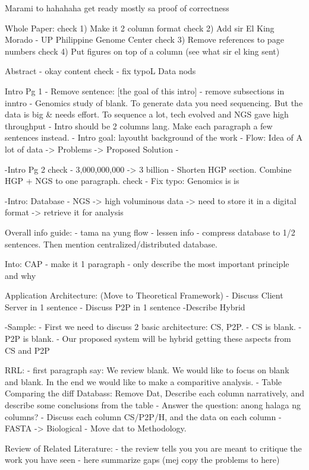 Marami to hahahaha get ready mostly sa proof of correctness

Whole Paper:
check 1) Make it 2 column format
check 2) Add sir El King Morado - UP Philippine Genome Center
check 3) Remove references to page numbers
check 4) Put figures on top of a column (see what sir el king sent)

Abstract
- okay content
check - fix typoL Data nods

Intro Pg 1
- Remove sentence: [the goal of this intro]
- remove subsections in inntro
- Genomics study of blank. To generate data you need sequencing. But the data is big & needs effort. To sequence a lot, tech evolved and NGS gave high throughput
- Intro should be 2 columns lang. Make each paragraph a few sentences instead.
- Intro goal: layoutht background of the work
- Flow: Idea of A lot of data -> Problems -> Proposed Solution
-

-Intro Pg 2
check - 3,000,000,000 -> 3 billion
- Shorten HGP section. Combine HGP + NGS to one paragraph.
check - Fix typo: Genomics is is

-Intro: Database
- NGS -> high voluminous data -> need to store it in a digital format -> retrieve it for analysis


Overall info guide: 
- tama na yung flow
- lessen info
- compress database to 1/2 sentences. Then mention centralized/distributed database.

Into: CAP
- make it 1 paragraph
- only describe the most important principle and why

Application Architecture: (Move to Theoretical Framework)
- Discuss Client Server in 1 sentence
- Discuss P2P in 1 sentence
-Describe Hybrid 

-Sample: 
- First we need to discuss 2 basic architecture: CS, P2P. 
- CS is blank. 
- P2P is blank. 
- Our proposed system will be hybrid getting these aspects from CS and P2P

RRL:
- first paragraph say: We review blank. We would like to focus on blank and blank. In the end we would like to make a comparitive analysis. 
- Table Comparing the diff Databass: Remove Dat, Describe each column narratively, and describe some conclusions from the table
- Answer the question: anong halaga ng columns? 
- Discuss each column CS/P2P/H, and the data on each column
- FASTA -> Biological
- Move dat to Methodology.

Review of Related Literature:
- the review tells you you are meant to critique the work you have seen
- here summarize gaps (mej copy the problems to here)


